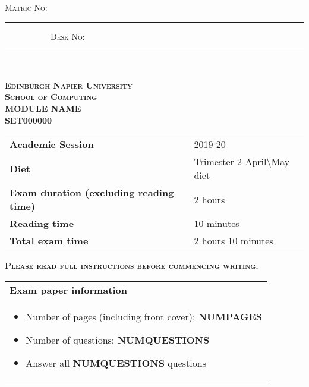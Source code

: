\documentclass[12pt, a4paper]{exam}
\newcommand*{\inputline}[1][3em]{\rule[0.5ex]{#1}{0.55pt}}
\begin{document}

\begin{titlepage}
\vspace*{1cm}

\textsc{Matric No:} \inputline[10em] \ \ \ \ \ \ \ \ \ \ \ \textsc{Desk No:} \inputline[10em]

\ 

\noindent \textsc{\Large {\bf{Edinburgh Napier University}}}\\[0.5cm]
\textsc{\Large {\bf{School of Computing}}}\\[1.5cm]

\noindent \textsc{\Large {\bf{MODULE NAME}}}\\[1cm] %
\textsc{\Large {\bf{SET000000}}}\\[1.5cm]           %

\vspace{-1cm}
\begin{table}[H]
\centering
\begin{tabular}{ll}
\textbf{Academic Session}                           & 2019-20 \\ %
 \textbf{Diet}                                      & Trimester 2 April\textbackslash May diet  \\ %
\textbf{Exam duration (excluding reading time)}     & 2 hours\\ %
 \textbf{Reading time}                              & 10 minutes \\ %
 \textbf{Total exam time}                           & 2 hours 10 minutes %
\end{tabular}
\end{table}

\vspace{1cm}
\noindent\textsc{{\bf{Please read full instructions before commencing writing.}}}

\begin{table}[H]
\centering
\begin{tabular}{p{14cm}}


{\bf{Exam paper information}}\\

    \begin{itemize}
      \item Number of pages (including front cover): {\bf{ NUMPAGES}} %
      \item Number of questions: {\bf{ NUMQUESTIONS}} %
      \item Answer all {\bf{ NUMQUESTIONS}} questions %
    \end{itemize} \\



\end{tabular}
\end{table}
\end{titlepage}
\end{document}
